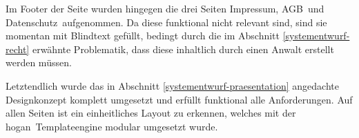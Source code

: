Im Footer der Seite wurden hingegen die drei Seiten \frqq Impressum\flqq , \frqq AGB\flqq\ und \frqq Datenschutz\flqq\ aufgenommen.
Da diese funktional nicht relevant sind, sind sie momentan mit Blindtext gefüllt, bedingt durch die im Abschnitt \ref{systementwurf-recht} erwähnte Problematik, dass diese inhaltlich durch einen Anwalt erstellt werden müssen.

Letztendlich wurde das in Abschnitt \ref{systementwurf-praesentation} angedachte Designkonzept komplett umgesetzt und erfüllt funktional alle Anforderungen.
Auf allen Seiten ist ein einheitliches Layout zu erkennen, welches mit der \frqq hogan\flqq\ Templateengine modular umgesetzt wurde.
